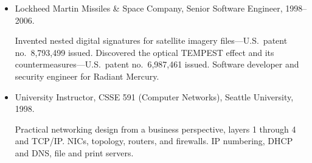 \begin{itemize}
    \vspace{-2mm}
	\item Lockheed Martin Missiles \& Space Company, Senior Software Engineer, 1998--2006.
		\vspace{-2mm}
		\begin{myquote}
            Invented nested digital signatures for satellite imagery
            files---U.S.\ patent no.~8,793,499 issued. Discovered the
            optical TEMPEST effect and its countermeasures---U.S.\ patent
            no.~6,987,461 issued. Software developer and security engineer
            for Radiant Mercury\rmtrademark.
		\end{myquote}

    \vspace{-2mm}
	\item University Instructor, CSSE 591 (Computer Networks), Seattle University, 1998.
        \vspace{-2mm}
        \begin{myquote}
            Practical networking design from a business perspective, layers
            1 through 4 and TCP/IP. NICs, topology, routers, and firewalls.
            IP numbering, DHCP and DNS, file and print servers.
        \end{myquote}
\end{itemize}

